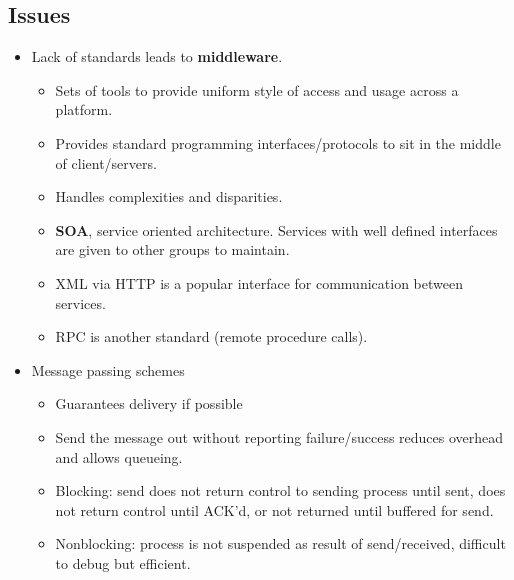\documentclass[fontsize=5pt]{scrartcl}
\begin{document}
\begin{multicols}{3}
     \subsection{Issues}
       \begin{itemize}
         \item Lack of standards leads to \textbf{middleware}.
         \begin{itemize}
           \item Sets of tools to provide uniform style of access and usage across a platform.
           \item Provides standard programming interfaces/protocols to sit in the middle of client/servers.
           \item Handles complexities and disparities.
           \item \textbf{SOA}, service oriented architecture. Services with well defined interfaces are given to other groups to maintain.
           \item XML via HTTP is a popular interface for communication between services.
           \item RPC is another standard (remote procedure calls).
         \end{itemize}
         \item Message passing schemes
         \begin{itemize}
           \item Guarantees delivery if possible
           \item Send the message out without reporting failure/success reduces overhead and allows queueing.
           \item Blocking: send does not return control to sending process until sent, does not return control until ACK'd, or not returned until buffered for send.
           \item Nonblocking: process is not suspended as result of send/received, difficult to debug but efficient.
         \end{itemize}
       \end{itemize}

\end{multicols}
\end{document}
